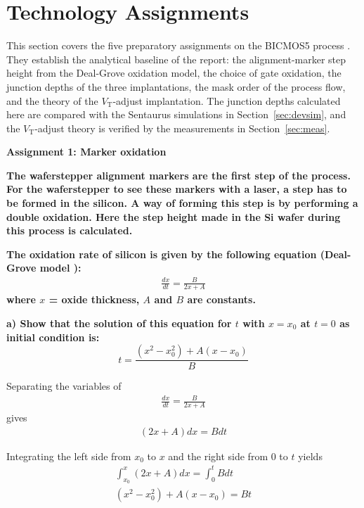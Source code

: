 \setlength{\parindent}{2em}   %
\setlength{\parskip}{0pt}     %

\section{Technology Assignments}
\label{sec:tech}

This section covers the five preparatory assignments on the BICMOS5 process \cite{et4icp_manual}. They establish the analytical baseline of the report: the alignment-marker step height from the Deal-Grove oxidation model, the choice of gate oxidation, the junction depths of the three implantations, the mask order of the process flow, and the theory of the $V_\mathrm{T}$-adjust implantation. The junction depths calculated here are compared with the Sentaurus simulations in Section~\ref{sec:devsim}, and the $V_\mathrm{T}$-adjust theory is verified by the measurements in Section~\ref{sec:meas}.

\vspace{0.5em}
\noindent \textbf{Assignment 1: Marker oxidation}

\noindent \textbf{The waferstepper alignment markers are the first step of the process. For the waferstepper to see these markers with a laser, a step has to be formed in the silicon. A way of forming this step is by performing a double oxidation. Here the step height made in the Si wafer during this process is calculated.}

\noindent \textbf{The oxidation rate of silicon is given by the following equation (Deal-Grove model \cite{deal1965general}):
\begin{align*}
    \frac{dx}{dt} = \frac{B}{2x + A}
\end{align*}
where $x$ = oxide thickness, $A$ and $B$ are constants.}

\vspace{0.5em}
\noindent \textbf{a) Show that the solution of this equation for $t$ with $x = x_0$ at $t = 0$ as initial condition is:
\[
t = \frac{(x^2 - x_0^2) + A(x - x_0)}{B}
\]}

Separating the variables of
\begin{gather*}
    \frac{dx}{dt} = \frac{B}{2x + A}
\end{gather*}
gives
\begin{gather*}
    (2x+A)dx = Bdt
\end{gather*}

Integrating the left side from $x_0$ to $x$ and the right side from $0$ to $t$ yields
\begin{gather*}
    \int_{x_0}^{x} (2x + A)dx = \int_{0}^{t} Bdt \\
    (x^2 - x_0^2) + A(x - x_0) = Bt \\
\end{gather*}

